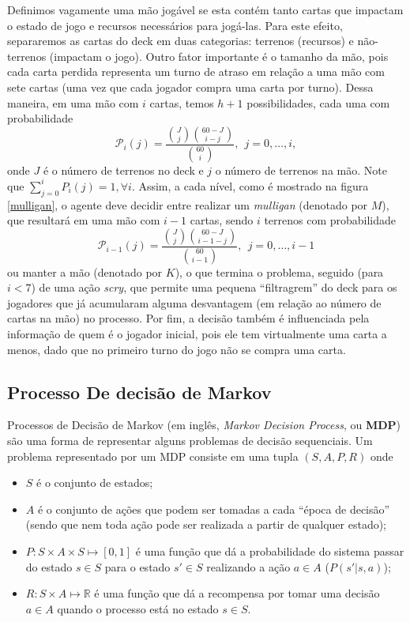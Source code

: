 \documentclass{book}
\begin{document}
Definimos vagamente uma mão jogável se esta contém tanto cartas que
impactam o estado de jogo e recursos necessários para jogá-las.
Para este efeito, separaremos as cartas do deck em duas categorias:
terrenos (recursos) e não-terrenos (impactam o jogo).
Outro fator importante é o tamanho da mão, pois cada carta perdida
representa um turno de atraso em relação a uma mão com sete cartas (uma
vez que cada jogador compra
uma carta por turno). Dessa maneira, em uma mão com $i$ cartas, temos
$h+1$ possibilidades, cada uma com probabilidade
\begin{equation} \label{eq:stateprob} \mathcal{P}_i(j) =
\frac{\binom{J}{j}\binom{60 - J}{i - j}}{\binom{60}{i}}, \ \
j = 0,\ldots, i, \end{equation} onde $J$ é o número de terrenos no deck
e $j$ o
número de terrenos
na mão. Note que $\sum_{j=0}^{i}P_i(j) = 1, \forall i$. Assim, a cada nível, como é mostrado na figura \ref{mulligan}, o
agente deve decidir entre realizar um \textit{mulligan}
(denotado por $M$), que resultará em uma mão com $i-1$ cartas, sendo $i$
terrenos com probabilidade
 \[ \mathcal{P}_{i - 1}(j) = \frac{\binom{J}{j}\binom{60 - J}{i - 1 -
j}}{\binom{60}{i - 1}}, \ \  j = 0,\ldots, i - 1\]
 ou manter a mão (denotado por $K$), o que termina o problema, seguido
(para $i < 7$) de uma ação \textit{scry}, que permite uma pequena
``filtragrem''
 do deck para os jogadores que já acumularam alguma desvantagem (em
relação ao número de cartas na mão) no processo. Por fim, a decisão
também é influenciada
 pela informação de quem é o jogador inicial, pois ele tem virtualmente
uma carta a menos, dado que no primeiro turno do jogo não se compra uma
carta.

\pagebreak
\subsection{Processo De decisão de Markov}
\label{ssec:mdp}

Processos de Decisão de Markov (em inglês, \textit{Markov Decision Process}, ou \textbf{MDP}) são uma forma de representar alguns problemas de decisão sequenciais. Um problema representado por um MDP consiste em
uma tupla $(S, A, P, R)$ onde
\begin{itemize}
  \item $S$ é o conjunto de estados;
  \item $A$ é o conjunto de ações que podem ser tomadas a cada ``época de decisão'' (sendo que nem toda ação pode ser realizada a partir de qualquer estado);
  \item $P: S \times A \times S \mapsto [0,1]$ é uma função que dá a probabilidade do sistema passar do estado $s \in S$ para o estado $s' \in S$
  realizando a ação $a \in A$ ($P(s'|s, a)$);
  \item $R: S \times A \mapsto \mathbb{R}$ é uma função que dá a recompensa por tomar uma decisão $a \in A$ quando o processo está no estado $s \in S$.
\end{itemize}
\end{document}
